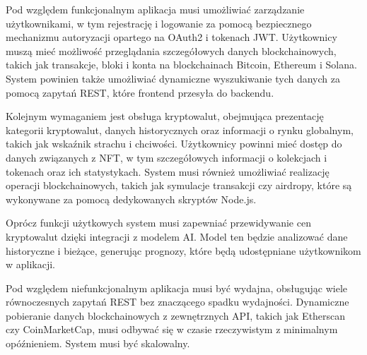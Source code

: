 Pod względem funkcjonalnym aplikacja musi umożliwiać zarządzanie użytkownikami, w tym rejestrację i logowanie za pomocą bezpiecznego mechanizmu autoryzacji opartego na OAuth2 i tokenach JWT. Użytkownicy muszą mieć możliwość przeglądania szczegółowych danych blockchainowych, takich jak transakcje, bloki i konta na blockchainach Bitcoin, Ethereum i Solana. System powinien także umożliwiać dynamiczne wyszukiwanie tych danych za pomocą zapytań REST, które frontend przesyła do backendu.

Kolejnym wymaganiem jest obsługa kryptowalut, obejmująca prezentację kategorii kryptowalut, danych historycznych oraz informacji o rynku globalnym, takich jak wskaźnik strachu i chciwości. Użytkownicy powinni mieć dostęp do danych związanych z NFT, w tym szczegółowych informacji o kolekcjach i tokenach oraz ich statystykach. System musi również umożliwiać realizację operacji blockchainowych, takich jak symulacje transakcji czy airdropy, które są wykonywane za pomocą dedykowanych skryptów Node.js.

Oprócz funkcji użytkowych system musi zapewniać przewidywanie cen kryptowalut dzięki integracji z modelem AI. Model ten będzie analizować dane historyczne i bieżące, generując prognozy, które będą udostępniane użytkownikom w aplikacji.

Pod względem niefunkcjonalnym aplikacja musi być wydajna, obsługując wiele równoczesnych zapytań REST bez znaczącego spadku wydajności. Dynamiczne pobieranie danych blockchainowych z zewnętrznych API, takich jak Etherscan czy CoinMarketCap, musi odbywać się w czasie rzeczywistym z minimalnym opóźnieniem. System musi być skalowalny.

